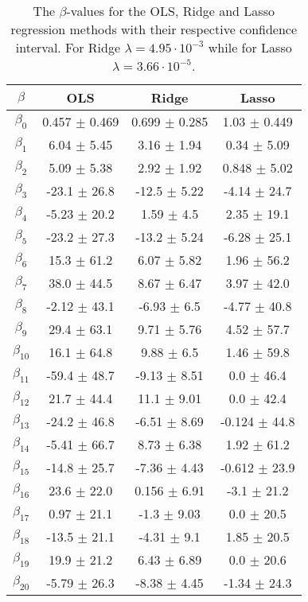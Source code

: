 \documentclass[uio,jmp,amsmath,amssymb,reprint,nofootinbib]{revtex4-1}
\numberwithin{equation}{section}
\begin{document}
\begin{table}
\begin{tabular}{|c|c|c|c|}\hline
\(\beta\) & OLS & Ridge & Lasso \\ \hline
\(\beta_{0}\) & 0.457 \(\pm\) 0.469 & 0.699 \(\pm\) 0.285 & 1.03 \(\pm\) 0.449 \\ \hline
\(\beta_{1}\) & 6.04 \(\pm\) 5.45 & 3.16 \(\pm\) 1.94 & 0.34 \(\pm\) 5.09 \\ \hline
\(\beta_{2}\) & 5.09 \(\pm\) 5.38 & 2.92 \(\pm\) 1.92 & 0.848 \(\pm\) 5.02 \\ \hline
\(\beta_{3}\) & -23.1 \(\pm\) 26.8 & -12.5 \(\pm\) 5.22 & -4.14 \(\pm\) 24.7 \\ \hline
\(\beta_{4}\) & -5.23 \(\pm\) 20.2 & 1.59 \(\pm\) 4.5 & 2.35 \(\pm\) 19.1 \\ \hline
\(\beta_{5}\) & -23.2 \(\pm\) 27.3 & -13.2 \(\pm\) 5.24 & -6.28 \(\pm\) 25.1 \\ \hline
\(\beta_{6}\) & 15.3 \(\pm\) 61.2 & 6.07 \(\pm\) 5.82 & 1.96 \(\pm\) 56.2 \\ \hline
\(\beta_{7}\) & 38.0 \(\pm\) 44.5 & 8.67 \(\pm\) 6.47 & 3.97 \(\pm\) 42.0 \\ \hline
\(\beta_{8}\) & -2.12 \(\pm\) 43.1 & -6.93 \(\pm\) 6.5 & -4.77 \(\pm\) 40.8 \\ \hline
\(\beta_{9}\) & 29.4 \(\pm\) 63.1 & 9.71 \(\pm\) 5.76 & 4.52 \(\pm\) 57.7 \\ \hline
\(\beta_{10}\) & 16.1 \(\pm\) 64.8 & 9.88 \(\pm\) 6.5 & 1.46 \(\pm\) 59.8 \\ \hline
\(\beta_{11}\) & -59.4 \(\pm\) 48.7 & -9.13 \(\pm\) 8.51 & 0.0 \(\pm\) 46.4 \\ \hline
\(\beta_{12}\) & 21.7 \(\pm\) 44.4 & 11.1 \(\pm\) 9.01 & 0.0 \(\pm\) 42.4 \\ \hline
\(\beta_{13}\) & -24.2 \(\pm\) 46.8 & -6.51 \(\pm\) 8.69 & -0.124 \(\pm\) 44.8 \\ \hline
\(\beta_{14}\) & -5.41 \(\pm\) 66.7 & 8.73 \(\pm\) 6.38 & 1.92 \(\pm\) 61.2 \\ \hline
\(\beta_{15}\) & -14.8 \(\pm\) 25.7 & -7.36 \(\pm\) 4.43 & -0.612 \(\pm\) 23.9 \\ \hline
\(\beta_{16}\) & 23.6 \(\pm\) 22.0 & 0.156 \(\pm\) 6.91 & -3.1 \(\pm\) 21.2 \\ \hline
\(\beta_{17}\) & 0.97 \(\pm\) 21.1 & -1.3 \(\pm\) 9.03 & 0.0 \(\pm\) 20.5 \\ \hline
\(\beta_{18}\) & -13.5 \(\pm\) 21.1 & -4.31 \(\pm\) 9.1 & 1.85 \(\pm\) 20.5 \\ \hline
\(\beta_{19}\) & 19.9 \(\pm\) 21.2 & 6.43 \(\pm\) 6.89 & 0.0 \(\pm\) 20.6 \\ \hline
\(\beta_{20}\) & -5.79 \(\pm\) 26.3 & -8.38 \(\pm\) 4.45 & -1.34 \(\pm\) 24.3 \\ \hline
\end{tabular}
\caption{The \(\beta\)-values for the OLS, Ridge and Lasso regression methods with their respective confidence interval. For Ridge \(\lambda = 4.95\cdot 10^{-3}\) while for Lasso \(\lambda = 3.66\cdot 10^{-5}\).}
\label{tab:13}
\end{table}
\end{document}
